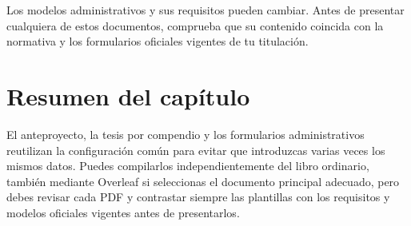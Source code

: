 Los modelos administrativos y sus requisitos pueden cambiar. Antes de presentar cualquiera de estos documentos, comprueba que su contenido coincida con la normativa y los formularios oficiales vigentes de tu titulación.


\section{Resumen del capítulo}
\label{sec:resumen-documentos-complementarios}

El anteproyecto, la tesis por compendio y los formularios administrativos reutilizan la configuración común para evitar que introduzcas varias veces los mismos datos. Puedes compilarlos independientemente del libro ordinario, también mediante Overleaf si seleccionas el documento principal adecuado, pero debes revisar cada PDF y contrastar siempre las plantillas con los requisitos y modelos oficiales vigentes antes de presentarlos.








